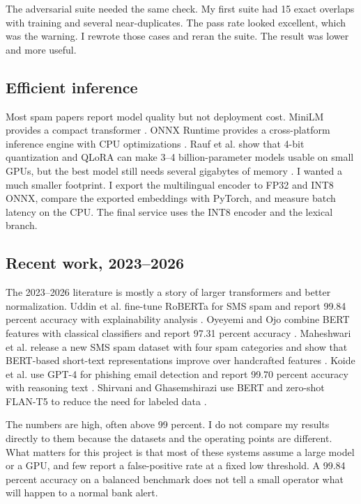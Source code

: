 \documentclass[11pt]{article}
\begin{document}
The adversarial suite needed the same check. My first suite had 15 exact overlaps with training and several near-duplicates. The pass rate looked excellent, which was the warning. I rewrote those cases and reran the suite. The result was lower and more useful.

\subsection{Efficient inference}

Most spam papers report model quality but not deployment cost. MiniLM provides a compact transformer \cite{wang2020}. ONNX Runtime provides a cross-platform inference engine with CPU optimizations \cite{onnxruntime}. Rauf et al. show that 4-bit quantization and QLoRA can make 3--4 billion-parameter models usable on small GPUs, but the best model still needs several gigabytes of memory \cite{rauf2026}. I wanted a much smaller footprint. I export the multilingual encoder to FP32 and INT8 ONNX, compare the exported embeddings with PyTorch, and measure batch latency on the CPU. The final service uses the INT8 encoder and the lexical branch.

\subsection{Recent work, 2023--2026}

The 2023--2026 literature is mostly a story of larger transformers and better normalization. Uddin et al. fine-tune RoBERTa for SMS spam and report 99.84 percent accuracy with explainability analysis \cite{uddin2024}. Oyeyemi and Ojo combine BERT features with classical classifiers and report 97.31 percent accuracy \cite{oyeyemi2024}. Maheshwari et al. release a new SMS spam dataset with four spam categories and show that BERT-based short-text representations improve over handcrafted features \cite{maheshwari2024}. Koide et al. use GPT-4 for phishing email detection and report 99.70 percent accuracy with reasoning text \cite{koide2024}. Shirvani and Ghasemshirazi use BERT and zero-shot FLAN-T5 to reduce the need for labeled data \cite{shirvani2025}.

The numbers are high, often above 99 percent. I do not compare my results directly to them because the datasets and the operating points are different. What matters for this project is that most of these systems assume a large model or a GPU, and few report a false-positive rate at a fixed low threshold. A 99.84 percent accuracy on a balanced benchmark does not tell a small operator what will happen to a normal bank alert.
\end{document}
